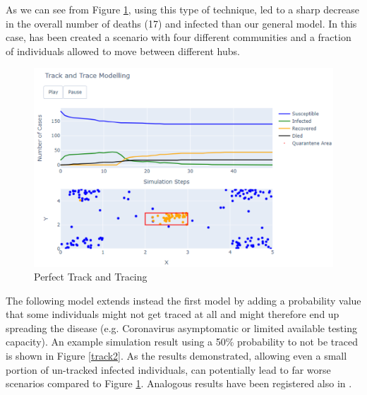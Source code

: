 As we can see from Figure \ref{track1}, using this type of technique, led to a sharp decrease in the overall number of deaths (17) and infected than our general model. In this case, has been created a scenario with four different communities and a fraction of individuals allowed to move between different hubs. 
\begin{figure}[ht!]%
    \centering
    \includegraphics[width=0.85\linewidth]{latex/images/track1.pdf}
    \vspace{-0.3cm}
    \caption{Perfect Track and Tracing}
    \label{track1}
\end{figure}
\vspace{-0.3cm}

The following model extends instead the first model by adding a probability value that some individuals might not get traced at all and might therefore end up spreading the disease (e.g. Coronavirus asymptomatic or limited available testing capacity). An example simulation result using a 50\% probability to not be traced is shown in Figure \ref{track2}. As the results demonstrated, allowing even a small portion of un-tracked infected individuals, can potentially lead to far worse scenarios compared to Figure \ref{track1}. Analogous results have been registered also in \cite{epic}.

